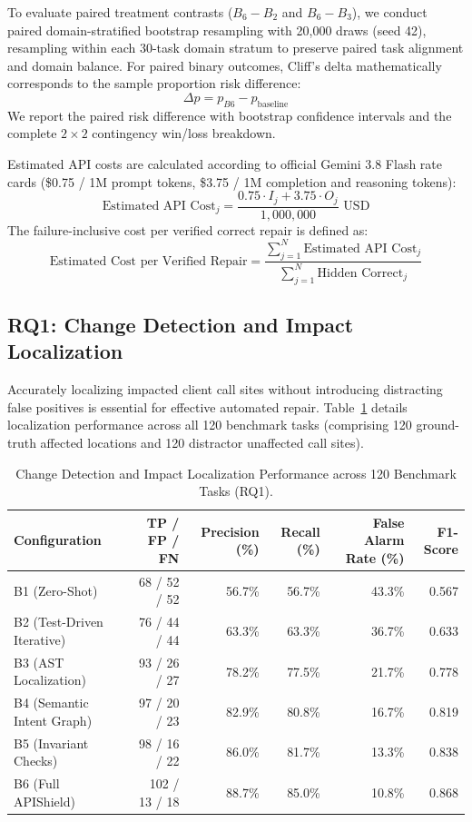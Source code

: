 To evaluate paired treatment contrasts (\(B_6 - B_2\) and \(B_6 - B_3\)), we conduct paired domain-stratified bootstrap resampling with 20,000 draws (seed 42), resampling within each 30-task domain stratum to preserve paired task alignment and domain balance. For paired binary outcomes, Cliff's delta mathematically corresponds to the sample proportion risk difference:
\[
\Delta p = p_{B6} - p_{\text{baseline}}
\]
We report the paired risk difference with bootstrap confidence intervals and the complete $2 \times 2$ contingency win/loss breakdown.

Estimated API costs are calculated according to official Gemini 3.8 Flash rate cards (\$0.75 / 1M prompt tokens, \$3.75 / 1M completion and reasoning tokens):
\[
\text{Estimated API Cost}_j = \frac{0.75 \cdot I_j + 3.75 \cdot O_j}{1{,}000{,}000} \text{ USD}
\]
The failure-inclusive cost per verified correct repair is defined as:
\[
\text{Estimated Cost per Verified Repair} = \frac{\sum_{j=1}^{N} \text{Estimated API Cost}_j}{\sum_{j=1}^{N} \text{Hidden Correct}_j}
\]

\subsection{RQ1: Change Detection and Impact Localization}
Accurately localizing impacted client call sites without introducing distracting false positives is essential for effective automated repair. Table~\ref{tab:localization} details localization performance across all 120 benchmark tasks (comprising 120 ground-truth affected locations and 120 distractor unaffected call sites).

\begin{table}[t]
\centering\small
\caption{Change Detection and Impact Localization Performance across 120 Benchmark Tasks (RQ1).}
\label{tab:localization}
\begin{tabular}{lrrrrr}
\toprule
Configuration & TP / FP / FN & Precision (\%) & Recall (\%) & False Alarm Rate (\%) & F1-Score \\
\midrule
B1 (Zero-Shot) & 68 / 52 / 52 & 56.7\% & 56.7\% & 43.3\% & 0.567 \\
B2 (Test-Driven Iterative) & 76 / 44 / 44 & 63.3\% & 63.3\% & 36.7\% & 0.633 \\
B3 (AST Localization) & 93 / 26 / 27 & 78.2\% & 77.5\% & 21.7\% & 0.778 \\
B4 (Semantic Intent Graph) & 97 / 20 / 23 & 82.9\% & 80.8\% & 16.7\% & 0.819 \\
B5 (Invariant Checks) & 98 / 16 / 22 & 86.0\% & 81.7\% & 13.3\% & 0.838 \\
B6 (Full APIShield) & 102 / 13 / 18 & 88.7\% & 85.0\% & 10.8\% & 0.868 \\
\bottomrule
\end{tabular}
\end{table}

